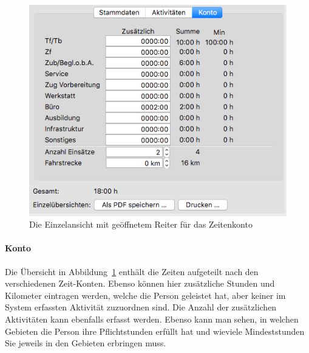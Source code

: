 \begin{figure}[!h]
	\centering
	\includegraphics[width=.75\textwidth]{img/einzelansicht_konto}
	\caption{Die Einzelansicht mit geöffnetem Reiter für das Zeitenkonto}
	\label{fig:personal:einzel:konto}
\end{figure}
\paragraph{Konto}
Die Übersicht in Abbildung~\ref{fig:personal:einzel:konto} enthält die Zeiten aufgeteilt nach den verschiedenen Zeit-Konten.
Ebenso können hier zusätzliche Stunden und Kilometer eintragen werden,
welche die Person geleistet hat, aber keiner im System erfassten Aktivität zuzuordnen sind.
Die Anzahl der zusätzlichen Aktivitäten kann ebenfalls erfasst werden.
Ebenso kann man sehen, in welchen Gebieten die Person ihre Pflichtstunden erfüllt hat und wieviele Mindeststunden Sie jeweils in den Gebieten erbringen muss.




